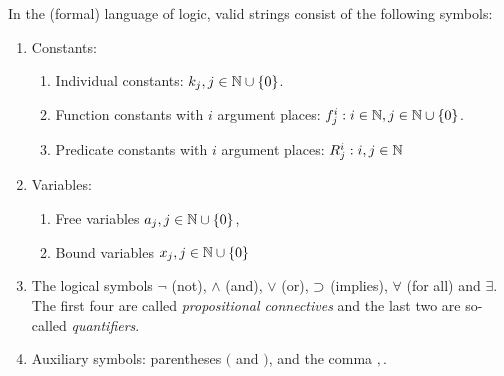 \documentclass[11pt,a4paper]{article}
\begin{document}
\begin{definition}%
    \label{def:classical alphabet}
    In the (formal) language of logic, valid strings consist of the following symbols:
    \begin{enumerate}
        \item\label{it:classical constants} Constants:
            \begin{enumerate}
                \item\label{it:classical constants individual}
                    Individual constants: \(k_j, j\in\mathbb{N}\cup\{0\}\).
                \item\label{it:classical constants function}
                    Function constants with \(i\) argument places: \(f_j^i : i\in\mathbb{N},j\in\mathbb{N}\cup\{0\}\).
                \item\label{it:classical constants predicates}
                    Predicate constants with \(i\) argument places: \(R_j^i : i, j\in\mathbb{N}\)
            \end{enumerate}
        \item\label{it:classical variables} Variables:
            \begin{enumerate}
                \item\label{it:classical variables free} Free variables \(a_j, j\in\mathbb{N}\cup\{0\}\),
                \item\label{it:classical variables bound} Bound variables \(x_j, j\in\mathbb{N}\cup\{0\}\)
            \end{enumerate}
        \item\label{it:classical logical symbols} The logical symbols \(\lnot\) (not), \(\land\) (and), \(\lor\) (or), \(\supset\) (implies),
            \(\forall\) (for all) and \(\exists\). The first four are called \emph{propositional connectives}
            and the last two are so-called \emph{quantifiers}.
        \item\label{it:classical auciliary symbols} Auxiliary symbols: parentheses \((\) and \()\), and the comma \(,\).
    \end{enumerate}
\end{definition}
\end{document}
